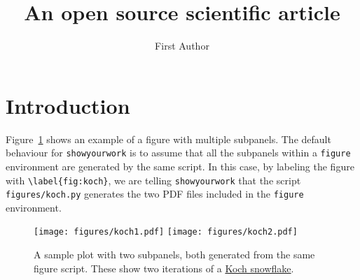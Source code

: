 \documentclass[twocolumn]{aastex631}
\begin{document}
\title{An open source scientific article}

\author{First Author}

\begin{abstract}
    \blindtext
\end{abstract}

\section{Introduction}

Figure~\ref{fig:koch} shows an example of a figure with multiple subpanels.
The default behaviour for \texttt{showyourwork} is to assume that all the subpanels within a \texttt{figure} environment are generated by the same script.
In this case, by labeling the figure with \verb+\label{fig:koch}+, we are telling \texttt{showyourwork} that the script \texttt{figures/koch.py} generates the two PDF files included in the \texttt{figure} environment.

\begin{figure}[ht!]
    \begin{centering}
        \texttt{[image: figures/koch1.pdf]}
        \texttt{[image: figures/koch2.pdf]}
        \caption{
            A sample plot with two subpanels, both generated from the same figure script.
            These show two iterations of a \href{https://en.wikipedia.org/wiki/Koch\_snowflake}{Koch snowflake}.
        }
        \label{fig:koch}
    \end{centering}
\end{figure}
\end{document}

